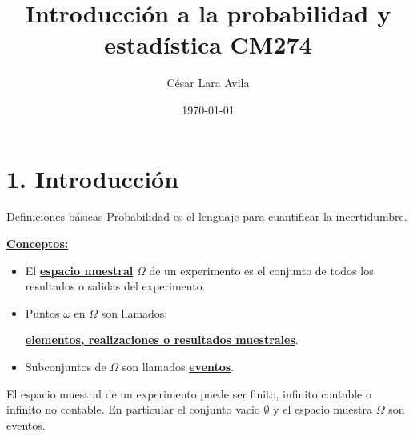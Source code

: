 \documentclass{beamer}
\title{Introducci\'on a la probabilidad y estad\'istica CM274}
\date{\today}
\author{C\'esar Lara Avila}
\institute{\url{https://github.com/C-Lara}}
\begin{document}
  \maketitle
  \section{1. Introducci\'on }
  
  
  \begin{frame}{Definiciones b\'asicas }
  Probabilidad es el lenguaje para cuantificar la incertidumbre. 
  
 \textbf{\underline{Conceptos:}}
  \begin{itemize}
  	\item El \textbf{\underline{espacio muestral}} $\Omega$ de un experimento es el conjunto de todos los resultados o salidas del experimento.
  	\item  Puntos $\omega$ en $\Omega$ son llamados:
  	
  	 \textbf{\underline{elementos, realizaciones o resultados muestrales}}.
  	\item  Subconjuntos de $\Omega$ son llamados \textbf{\underline{eventos}}.
  \end{itemize}
   El espacio muestral de un experimento puede ser finito, infinito contable o infinito no contable. En particular el conjunto vacio $\emptyset$ y el espacio muestra $\Omega$ son eventos.
  \end{frame}
  
\end{document}
